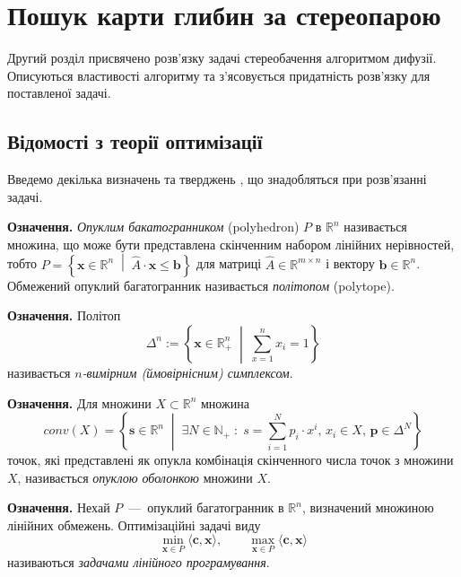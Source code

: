 \chapter{Пошук карти глибин за стереопарою}

Другий розділ присвячено розв'язку задачі стереобачення алгоритмом дифузії.
Описуються властивості алгоритму та з'ясовується придатність
розв'язку для поставленої задачі.

\section{Відомості з теорії оптимізації}
Введемо декілька визначень та тверджень \cite{overview:savchynskyy:diffusion},
що знадобляться при розв'язанні задачі.

\textbf{Означення.}
\textit{Опуклим бакатогранником} (polyhedron) $P$ в $\mathbb{R}^n$ називається множина,
що може бути представлена скінченним набором лінійних нерівностей,
тобто
$P = \left\{
    \pmb{x} \in \mathbb{R}^n \; \middle| \;
    \hat{A} \cdot \pmb{x} \le \pmb{b}
\right\}$
для матриці $\hat{A} \in \mathbb{R}^{m \times n}$ і вектору
$\pmb{b} \in \mathbb{R}^n$.
Обмежений опуклий багатогранник називається \textit{політопом} (polytope).

\textbf{Означення.}
Політоп
\begin{equation} \label{simplex}
    \Delta^n := \left\{
    \pmb{x} \in \mathbb{R}^n_+ \; \middle| \; \sum \limits_{x = 1}^n x_i = 1
    \right\}
\end{equation}
називається \textit{$n$-вимірним (ймовірнісним) симплексом}.

\textbf{Означення.}
Для множини $X \subset \mathbb{R}^n$ множина
\begin{equation*}
    conv \left(X \right) = \left\{
        \pmb{s} \in \mathbb{R}^n \; \middle| \;
        \exists N \in \mathbb{N}_+ \; : \;
        s = \sum \limits_{i = 1}^N p_i \cdot x^i, \,
        x_i \in X, \,
        \pmb{p} \in \Delta^N
    \right\}
\end{equation*}
точок,
які представлені як опукла комбінація скінченного числа точок з множини $X$,
називається \textit{опуклою оболонкою} множини $X$.

\textbf{Означення.}
Нехай $P$~---~опуклий багатогранник в $\mathbb{R}^n$,
визначений множиною лінійних обмежень.
Оптимізаційні задачі виду
\begin{equation*}
    \min \limits_{\pmb{x} \in P} \langle \pmb{c}, \pmb{x} \rangle, \qquad
    \max \limits_{\pmb{x} \in P} \langle \pmb{c}, \pmb{x} \rangle
\end{equation*}
називаються \textit{задачами лінійного програмування}.


